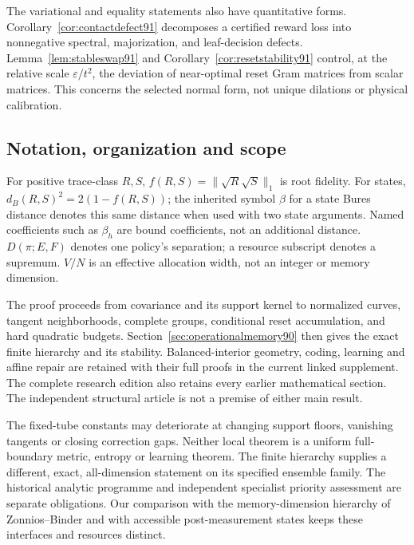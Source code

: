 The variational and equality statements also have quantitative forms.
Corollary~\ref{cor:contactdefect91} decomposes a certified reward loss
into nonnegative spectral, majorization, and leaf-decision defects.
Lemma~\ref{lem:stableswap91} and Corollary~\ref{cor:resetstability91}
control, at the relative scale $\varepsilon/t^2$, the deviation of
near-optimal reset Gram matrices from scalar matrices.  This concerns
the selected normal form, not unique dilations or physical calibration.

\subsection{Notation, organization and scope}
For positive trace-class $R,S$, $f(R,S)=\|\sqrt R\sqrt S\|_1$ is root
fidelity.  For states, $d_B(R,S)^2=2(1-f(R,S))$; the inherited symbol
$\beta$ for a state Bures distance denotes this same distance when used
with two state arguments.  Named coefficients such as $\beta_h$ are
bound coefficients, not an additional distance.  $D(\pi;E,F)$ denotes
one policy's separation; a resource subscript denotes a supremum.
$V/N$ is an effective allocation width, not an integer or memory dimension.

The proof proceeds from covariance and its support kernel to normalized
curves, tangent neighborhoods, complete groups, conditional reset
accumulation, and hard quadratic budgets.  Section~\ref{sec:operationalmemory90}
then gives the exact finite hierarchy and its stability.  Balanced-interior
geometry, coding, learning and affine repair are retained with their full
proofs in the current linked supplement.  The complete research edition
also retains every earlier mathematical section.  The independent
structural article is not a premise of either main result.

The fixed-tube constants may deteriorate at changing support floors,
vanishing tangents or closing correction gaps.  Neither local theorem
is a uniform full-boundary metric, entropy or learning theorem.  The
finite hierarchy supplies a different, exact, all-dimension statement on
its specified ensemble family.  The historical analytic programme and
independent specialist priority assessment are separate obligations.
Our comparison with the memory-dimension hierarchy of Zonnios--Binder
\cite{ZB90} and with accessible post-measurement states \cite{EQ90}
keeps these interfaces and resources distinct.
